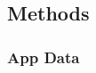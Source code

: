 \documentclass[man, floatsintext]{apa7}
\begin{document}







\subsection{Methods}

\subsubsection{App Data}
\end{document}
